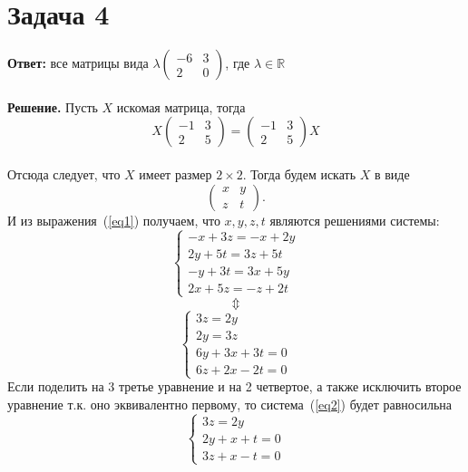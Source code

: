\documentclass{article}
\begin{document}
\section*{Задача 4}
{\bf Ответ:} все матрицы вида $\lambda\left(\begin{array}{rr}-6 & 3\\2 & 0\end{array}\right)$, где $\lambda\in\mathbb{R}$
\\
\\
{\bf Решение.} Пусть $X$ искомая матрица, тогда
\begin{equation}
\label{eq1}
    X\left(\begin{array}{rr}-1 & 3\\2 & 5\end{array}\right)=\left(\begin{array}{rr}-1 & 3\\2 & 5\end{array}\right)X
\end{equation}
\\
Отсюда следует, что $X$ имеет размер $2\times 2$. Тогда будем искать $X$ в виде 
$$\left(\begin{array}{rr}x & y\\z & t\end{array}\right).$$
И из выражения~(\ref{eq1}) получаем, что $x,y,z,t$ являются решениями системы:
$$\begin{cases}-x+3z=-x+2y\\2y+5t=3z+5t\\-y+3t=3x+5y\\2x+5z=-z+2t\end{cases}$$
$$\Updownarrow$$
\begin{equation}
\label{eq2}
    \begin{cases}3z=2y\\2y=3z\\6y+3x+3t=0\\6z+2x-2t=0\end{cases}
\end{equation}
Если поделить на 3 третье уравнение и на 2 четвертое, а также исключить второе уравнение т.к. оно эквивалентно первому, то система~(\ref{eq2}) будет равносильна
\begin{equation}
\label{eq3}
    \begin{cases}3z=2y\\2y+x+t=0\\3z+x-t=0\end{cases}
\end{equation}
\end{document}
